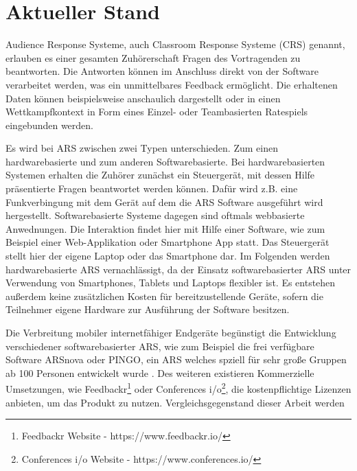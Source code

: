 \documentclass[conference]{IEEEtran}
\begin{document}
\section{Aktueller Stand}

Audience Response Systeme, auch Classroom Response Systeme (CRS) genannt, erlauben es einer gesamten Zuhörerschaft Fragen des Vortragenden zu beantworten. Die Antworten können im Anschluss direkt von der Software verarbeitet werden, was ein unmittelbares Feedback ermöglicht. Die erhaltenen Daten können beispielsweise anschaulich dargestellt oder in einen Wettkampfkontext in Form eines Einzel- oder Teambasierten Ratespiels eingebunden werden.

Es wird bei ARS zwischen zwei Typen unterschieden. Zum einen hardwarebasierte und zum anderen Softwarebasierte. Bei hardwarebasierten Systemen erhalten die Zuhörer zunächst ein Steuergerät, mit dessen Hilfe präsentierte Fragen beantwortet werden können. Dafür wird z.B. eine Funkverbingung mit dem Gerät auf dem die ARS Software ausgeführt wird hergestellt. 
Softwarebasierte Systeme dagegen sind oftmals webbasierte Anwednungen. Die Interaktion findet hier mit Hilfe einer Software, wie zum Beispiel einer Web-Applikation oder Smartphone App statt. Das Steuergerät stellt hier der eigene Laptop oder das Smartphone dar.
Im Folgenden werden hardwarebasierte ARS vernachlässigt, da der Einsatz softwarebasierter ARS unter Verwendung von Smartphones, Tablets und Laptops flexibler ist. \cite[p. 340]{Hobert2017} Es entstehen außerdem keine zusätzlichen Kosten für bereitzustellende Geräte, sofern die Teilnehmer eigene Hardware zur Ausführung der Software besitzen.

Die Verbreitung mobiler internetfähiger Endgeräte begünstigt die Entwicklung verschiedener softwarebasierter ARS, wie zum Beispiel die frei verfügbare Software ARSnova \cite{Quibeldey-Cirkel2013} oder PINGO, ein ARS welches spziell für sehr große Gruppen ab 100 Personen entwickelt wurde \cite{Reinhardt2012}. Des weiteren existieren Kommerzielle Umsetzungen, wie Feedbackr\footnote[3]{Feedbackr Website - https://www.feedbackr.io/} oder Conferences i/o\footnote[4]{Conferences i/o Website - https://www.conferences.io/}, die kostenpflichtige Lizenzen anbieten, um das Produkt zu nutzen. Vergleichsgegenstand dieser Arbeit werden 
\end{document}
